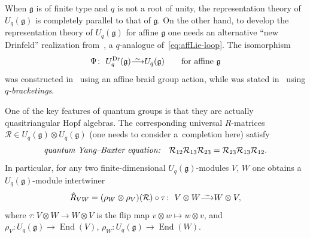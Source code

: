 \documentclass[10pt,a4paper]{amsart}
\numberwithin{equation}{section}
\DeclareMathOperator{\End}{End}
\newcommand{\fg}{\mathfrak{g}}
\newcommand\iso{ \vphantom{j^{X^2}}\smash{\overset{\sim}{\vphantom{\rule{0pt}{0.20em}}\smash{\longrightarrow}}} }
\begin{document}
When $\fg$ is of finite type and $q$ is not a root of unity, the representation theory of $U_q(\fg)$ is completely parallel to that of $\fg$. On the other hand, to develop the representation theory of $U_q(\fg)$ for affine $\fg$ one needs an alternative ``new Drinfeld'' realization \smash{$U^{\mathrm{Dr}}_q(\fg)$} from~\cite{D}, a $q$-analogue of~\eqref{eq:affLie-loop}. The isomorphism
\begin{equation}\label{eq:Dr-to-DJ-intro}
 \Psi\colon\ U^{\mathrm{Dr}}_q(\fg)\iso U_q(\fg) \qquad \text{for affine} \ \fg
\end{equation}
was constructed in~\cite{B} using an affine braid group action, while  was stated in~\cite{D} using \textit{$q$-bracketings}.

One of the key features of quantum groups is that they are actually quasitriangular Hopf algebras. The corresponding universal $R$-matrices $\mathcal{R}\in U_q(\fg)\otimes U_q(\fg)$ (one needs to consider a~completion here) satisfy
\begin{equation}\label{eq:qYB-intro}
 \text{\textit{quantum Yang--Baxter equation:}}
 \quad \mathcal{R}_{12}\mathcal{R}_{13}\mathcal{R}_{23}=\mathcal{R}_{23}\mathcal{R}_{13}\mathcal{R}_{12}.
\end{equation}
In particular, for any two finite-dimensional $U_q(\fg)$-modules $V$, $W$ one obtains a $U_q(\fg)$-module intertwiner
\begin{equation}\label{eq:intertwiner-intro}
 \hat{R}_{VW}=(\rho_W\otimes \rho_V)(\mathcal{R})\circ \tau\colon\ V\otimes W \iso W\otimes V,
\end{equation}
where $\tau\colon V\otimes W\to W\otimes V$ is the flip map $v\otimes w\mapsto w\otimes v$, and $\rho_V\colon U_q(\fg)\to \End(V)$, $\rho_W\colon U_q(\fg)\to \End(W)$.
\end{document}
